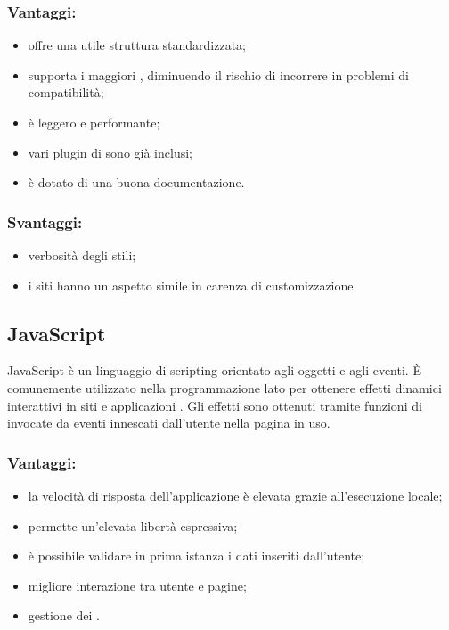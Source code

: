 \documentclass[a4paper, titlepage]{article}
\begin{document}
\subsubsection{Vantaggi:}

\begin{itemize}
	\item offre una utile struttura standardizzata;
	\item supporta i maggiori , diminuendo il rischio di incorrere in problemi di compatibilità;
	\item è leggero e performante;
	\item vari plugin di  sono già inclusi;
	\item è dotato di una buona documentazione.
\end{itemize}

\subsubsection{Svantaggi:}

\begin{itemize}
	\item verbosità degli stili;
	\item i siti hanno un aspetto simile in carenza di customizzazione.
\end{itemize}

\subsection{JavaScript}
JavaScript è un linguaggio di scripting orientato agli oggetti e agli eventi. È comunemente utilizzato nella programmazione  lato  per ottenere effetti dinamici interattivi in siti e applicazioni . Gli effetti sono ottenuti tramite funzioni di  invocate da eventi innescati dall'utente nella pagina  in uso.

\subsubsection{Vantaggi:}

\begin{itemize}
	\item la velocità di risposta dell'applicazione è elevata grazie all'esecuzione locale;
	\item {} permette un'elevata libertà espressiva;
	\item è possibile validare in prima istanza i dati inseriti dall'utente;
	\item migliore interazione tra utente e pagine;
	\item gestione dei .
\end{itemize}
\end{document}
